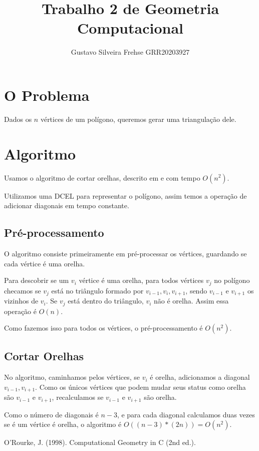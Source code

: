 \documentclass[12pt]{article}
\title{Trabalho 2 de Geometria Computacional}
\author{Gustavo Silveira Frehse GRR20203927}
\begin{document}
  \maketitle
  \section{O Problema}
  Dados os $n$ vértices de um polígono, queremos gerar uma triangulação dele.
  
  \section{Algoritmo}
  Usamos o algoritmo de cortar orelhas, descrito em \cite{earcut} e com tempo
  $O(n^2)$. 

  Utilizamos uma DCEL para representar o polígono, assim temos a operação de
  adicionar diagonais em tempo constante.
  
  \subsection{Pré-processamento}
  O algoritmo consiste primeiramente em pré-processar os vértices, guardando se
  cada vértice é uma orelha.
  
  Para descobrir se um $v_i$ vértice é uma orelha, para todos vértices $v_j$ no
  polígono checamos se $v_j$ está no triângulo formado por $v_{i-1}, v_i,
  v_{i+1}$, sendo $v_{i-1}$ e $v_{i+1}$ os vizinhos de $v_i$. Se $v_j$ está
  dentro do triângulo, $v_i$ não é orelha. Assim essa operação é $O(n)$.
  
  Como fazemos isso para todos os vértices, o pré-processamento é $O(n^2)$.
  
  \subsection{Cortar Orelhas}
  No algoritmo, caminhamos pelos vértices, se $v_i$ é orelha, adicionamos a
  diagonal $v_{i-1}, v_{i+1}$. Como os únicos vértices que podem mudar seus
  status como orelha são $v_{i-1}$ e $v_{i+1}$, recalculamos se $v_{i-1}$ e
  $v_{i+1}$ são orelha.
  
  Como o número de diagonais é $n-3$, e para cada diagonal calculamos duas vezes
  se é um vértice é orelha, o algoritmo é $O((n - 3) * (2n)) = O(n^2)$.

  \begin{thebibliography}{9}
     O'Rourke, J. (1998). Computational Geometry in C (2nd ed.).
  \end{thebibliography}
\end{document}
